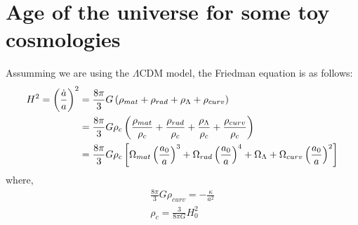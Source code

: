 \section{ Age of the universe for some toy cosmologies}
Assumming we are using the $\Lambda$CDM model, the Friedman equation is as follows:
\begin{align}
	H^2 = \left( \frac{\dot{a}}{a}\right)^2 &= \frac{8\pi}{3} G \left( \rho_{mat} + \rho_{rad} + \rho_\Lambda + \rho_{curv}   \right) \notag \\
	&=\frac{8\pi}{3} G \rho_c \left( \frac{\rho_{mat}}{\rho_c} + \frac{\rho_{rad}}{\rho_c} + \frac{\rho_\Lambda}{\rho_c} + \frac{\rho_{curv}}{\rho_c}   \right) \notag  \\
	&=\frac{8\pi}{3} G \rho_c \left[ \Omega_{mat} \left( \frac{a_0}{a}\right)^3 + \Omega_{rad} \left( \frac{a_0}{a}\right)^4 + \Omega_{\Lambda} + \Omega_{curv}\left( \frac{a_0}{a}\right)^2 \right] 
\end{align}
where,
\begin{align}
\frac{8\pi}{3} G \rho_{curv} = -\frac{\kappa}{a^2} \\
\rho_c = \frac{3}{8\pi G}H_0^2
\end{align}
